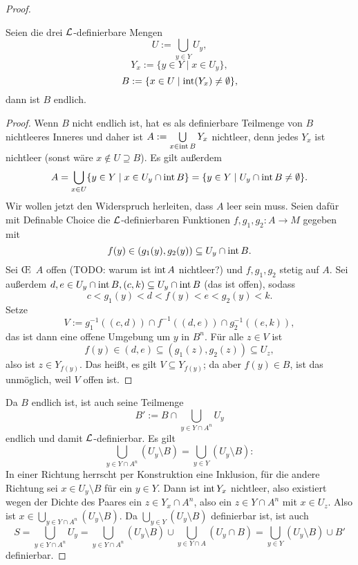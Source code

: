 \begin{proof}
	\begin{lemma}
		Seien die drei $\mathcal{L}$-definierbare Mengen $$U:=\bigcup\limits_{y\in Y}U_y,$$ $$Y_x:=\{y\in Y\mid x\in U_y\},$$ $$B:=\{x\in U\mid\operatorname{int}(Y_x)\neq\emptyset\},$$ dann ist $B$ endlich.
	\end{lemma}
    \begin{proof}
    	Wenn $B$ nicht endlich ist, hat es als definierbare Teilmenge von $B$ nichtleeres Inneres und daher ist $A:=\bigcup\limits_{x\in\operatorname{int} B}Y_x$ nichtleer, denn jedes $Y_x$ ist nichtleer (sonst wäre $x\notin U\supseteq B$). Es gilt außerdem $$A=\bigcup\limits_{x\in U}\{y\in Y\mid x\in U_y\cap\operatorname{int} B\}=\{y\in Y\mid U_y\cap\operatorname{int} B\neq\emptyset\}.$$
    	Wir wollen jetzt den Widerspruch herleiten, dass $A$ leer sein muss. Seien dafür mit Definable Choice die $\mathcal{L}$-definierbaren Funktionen $f,g_1,g_2:A\rightarrow M$ gegeben mit $$f(y)\in(g_1(y),g_2(y))\subseteq U_y\cap\operatorname{int} B.$$
    	Sei \OE\ $A$ offen (TODO: warum ist $\operatorname{int} A$ nichtleer?) und $f,g_1,g_2$ stetig auf $A$. Sei außerdem $d,e\in U_y\cap\operatorname{int} B, (c,k)\subseteq U_y\cap\operatorname{int} B$ (das ist offen), sodass $$c<g_1(y)<d<f(y)<e<g_2(y)<k.$$ Setze $$V:=g_1^{-1}((c,d))\cap f^{-1}((d,e))\cap g_2^{-1}((e,k)),$$ das ist dann eine offene Umgebung um $y$ in $B^n$. Für alle $z\in V$ ist $$f(y)\in(d,e)\subseteq(g_1(z),g_2(z))\subseteq U_z,$$ also ist $z\in Y_{f(y)}$. Das heißt, es gilt $V\subseteq Y_{f(y)}$; da aber $f(y)\in B$, ist das unmöglich, weil $V$ offen ist.
    \end{proof}
    
    Da $B$ endlich ist, ist auch seine Teilmenge $$B':=B\cap\bigcup\limits_{y\in Y\cap A^n}U_y$$ endlich und damit $\mathcal{L}$-definierbar. Es gilt $$\bigcup\limits_{y\in Y\cap A^n}(U_y\setminus B)=\bigcup\limits_{y\in Y}(U_y\setminus B):$$ In einer Richtung herrscht per Konstruktion eine Inklusion, für die andere Richtung sei $x\in U_y\setminus B$ für ein $y\in Y$. Dann ist $\operatorname{int} Y_x$ nichtleer, also existiert wegen der Dichte des Paares ein $z\in Y_x\cap A^n$, also ein $z\in Y\cap A^n$ mit $x\in U_z$. Also ist $x\in\bigcup\limits_{y\in Y\cap A^n}(U_y\setminus B)$. Da $\bigcup\limits_{y\in Y}(U_y\setminus B)$ definierbar ist, ist auch $$S=\bigcup\limits_{y\in Y\cap A^n}U_y=\bigcup\limits_{y\in Y\cap A^n}(U_y\setminus B)\cup\bigcup\limits_{y\in Y\cap A}(U_y\cap B)=\bigcup\limits_{y\in Y}(U_y\setminus B)\cup B'$$ definierbar.
\end{proof}

